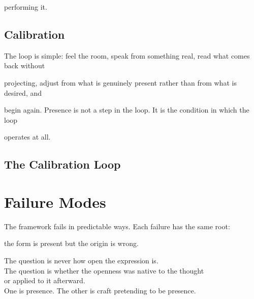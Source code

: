 \documentclass[12pt, a4paper]{article}
\begin{document}
performing it.

\subsection{Calibration}\label{subsec:calibration}

The loop is simple: feel the room, speak from something real, read what comes back without

projecting, adjust from what is genuinely present rather than from what is desired, and

begin again. Presence is not a step in the loop. It is the condition in which the loop

operates at all.


\subsection{The Calibration Loop}\label{subsec:calibration_loop}




\section{Failure Modes}

The framework fails in predictable ways. Each failure has the same root:

the form is present but the origin is wrong.



\begin{calloutbox}

The question is never how open the expression is.\\

The question is whether the openness was native to the thought\\

or applied to it afterward.\\[0.4em]

One is presence. The other is craft pretending to be presence.

\end{calloutbox}

\end{document}
